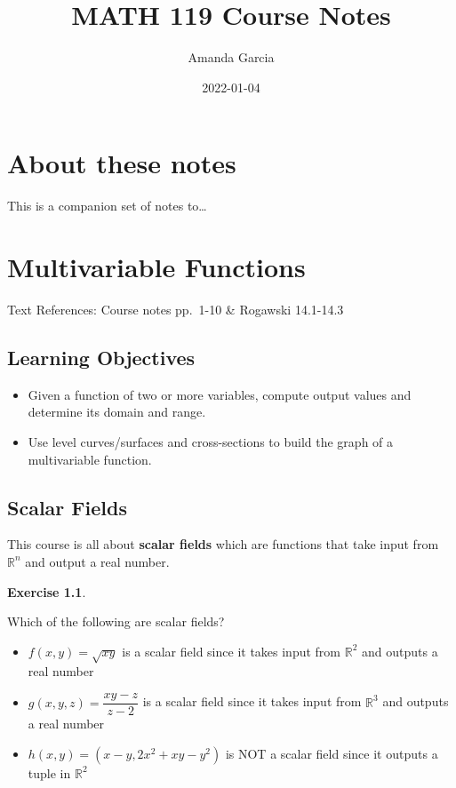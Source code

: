 \documentclass[
]{book}
\title{MATH 119 Course Notes}
\author{Amanda Garcia}
\date{2022-01-04}
\providecommand{\tightlist}{%
  \setlength{\itemsep}{0pt}\setlength{\parskip}{0pt}}
\theoremstyle{definition}
\theoremstyle{definition}
\theoremstyle{definition}
\newtheorem{exercise}{Exercise}[chapter]
\theoremstyle{definition}
\theoremstyle{remark}
\begin{document}
\maketitle

{
\setcounter{tocdepth}{1}
\tableofcontents
}
\hypertarget{about-these-notes}{%
\chapter*{About these notes}\label{about-these-notes}}

This is a companion set of notes to\ldots{}

\hypertarget{lec-1}{%
\chapter{Multivariable Functions}\label{lec-1}}

Text References: Course notes pp.~1-10 \& Rogawski 14.1-14.3

\hypertarget{learning-objectives}{%
\section{Learning Objectives}\label{learning-objectives}}

\begin{itemize}
\tightlist
\item
  Given a function of two or more variables, compute output values and determine its domain and range.
\item
  Use level curves/surfaces and cross-sections to build the graph of a multivariable function.
\end{itemize}

\hypertarget{scalar-fields}{%
\section{Scalar Fields}\label{scalar-fields}}

This course is all about \textbf{scalar fields} which are functions that take input from \(\mathbb{R}^n\) and output a real number.

\begin{exercise}
\protect\hypertarget{exr:unlabeled-div-1}{}\label{exr:unlabeled-div-1}

Which of the following are scalar fields?

\begin{itemize}
\tightlist
\item
  \(f(x,y)=\sqrt{xy}\) is a scalar field since it takes input from \(\mathbb{R}^2\) and outputs a real number
\item
  \(g(x,y,z)= \dfrac{xy-z}{z-2}\) is a scalar field since it takes input from \(\mathbb{R}^3\) and outputs a real number
\item
  \(h(x,y) = (x-y, 2x^2+xy - y^2)\) is NOT a scalar field since it outputs a tuple in \(\mathbb{R}^2\)
\end{itemize}

\end{exercise}
\end{document}
